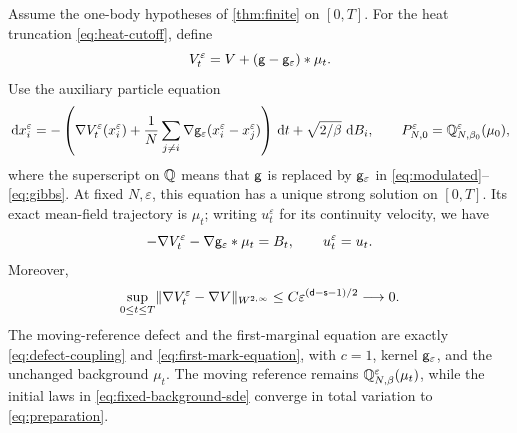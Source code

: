 \documentclass[11pt,reqno]{amsart}
\numberwithin{equation}{section}
\theoremstyle{plain}
\theoremstyle{remark}
\DeclarePairedDelimiter{\norm}{\lVert}{\rVert}
\renewcommand{\d}{\mathsf{d}}\newcommand{\s}{\mathsf{s}}
\begin{document}
\begin{lemma}\label{lem:fixed-background-approximation}
Assume the one-body hypotheses of \cref{thm:finite} on $[0,T]$. For the heat truncation \eqref{eq:heat-cutoff}, define
\begin{equation}\label{eq:fixed-background-confinement}
 V_t^\varepsilon=V+(\mathsf g-\mathsf g_\varepsilon)*\mu_t.
\end{equation}
Use the auxiliary particle equation
\begin{equation}\label{eq:fixed-background-sde}
 \,\mathrm d x_i^\varepsilon=-\left(\nabla V_t^\varepsilon(x_i^\varepsilon)
 +\frac1N\sum_{j\ne i}\nabla\mathsf g_\varepsilon(x_i^\varepsilon-x_j^\varepsilon)\right)\,\mathrm d t
 +\sqrt{2/\beta}\,\,\mathrm d B_i,
 \qquad P_{N,0}^\varepsilon=\mathbb Q_{N,\beta_0}^\varepsilon(\mu_0),
\end{equation}
where the superscript on $\mathbb Q$ means that $\mathsf g$ is replaced by $\mathsf g_\varepsilon$ in \eqref{eq:modulated}--\eqref{eq:gibbs}. At fixed $N,\varepsilon$, this equation has a unique strong solution on $[0,T]$. Its exact mean-field trajectory is $\mu_t$; writing $u_t^\varepsilon$ for its continuity velocity, we have
\begin{equation}\label{eq:fixed-background-drift}
 -\nabla V_t^\varepsilon-\nabla\mathsf g_\varepsilon*\mu_t=B_t,
 \qquad u_t^\varepsilon=u_t.
\end{equation}
Moreover,
\begin{equation}\label{eq:fixed-background-force-bound}
 \sup_{0\le t\le T}\norm{\nabla V_t^\varepsilon-\nabla V}_{W^{2,\infty}}
 \le C\varepsilon^{(\d-\s-1)/2}\longrightarrow0.
\end{equation}
The moving-reference defect and the first-marginal equation are exactly \eqref{eq:defect-coupling} and \eqref{eq:first-mark-equation}, with $c=1$, kernel $\mathsf g_\varepsilon$, and the unchanged background $\mu_t$. The moving reference remains $\mathbb Q_{N,\beta}^\varepsilon(\mu_t)$, while the initial laws in \eqref{eq:fixed-background-sde} converge in total variation to \eqref{eq:preparation}.
\end{lemma}
\end{document}
